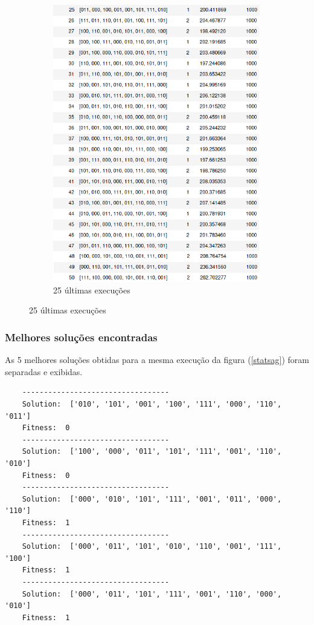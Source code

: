 \begin{figure}[H]
\begin{subfigure}{.5\textwidth}
		\includegraphics[scale=.5]{img/df2}
		\caption{25 últimas execuções}
	\end{subfigure}%
\end{figure}



\subsubsection{Melhores soluções encontradas}

As 5 melhores soluções obtidas para a mesma execução da figura (\ref{statsag}) foram separadas e exibidas.



\begin{verbatim}
	----------------------------------
	Solution:  ['010', '101', '001', '100', '111', '000', '110', '011']
	Fitness:  0
	----------------------------------
	Solution:  ['100', '000', '011', '101', '111', '001', '110', '010']
	Fitness:  0
	----------------------------------
	Solution:  ['000', '010', '101', '111', '001', '011', '000', '110']
	Fitness:  1
	----------------------------------
	Solution:  ['000', '011', '101', '010', '110', '001', '111', '100']
	Fitness:  1
	----------------------------------
	Solution:  ['000', '011', '101', '111', '001', '110', '000', '010']
	Fitness:  1
\end{verbatim}